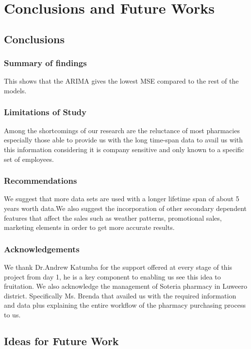 \documentclass[12pt]{report}
\begin{document}
\chapter{Conclusions and Future Works}

\section{Conclusions}

\subsection{Summary of findings}
This shows that the ARIMA gives the lowest MSE compared to the rest of the models.
\subsection{Limitations of Study}
Among the shortcomings of our research are the reluctance of most pharmacies especially those able to provide us with the long time-span data to avail us with this information considering it is company sensitive and only known to a specific set of employees.

\subsection{Recommendations}
We suggest that more data sets are used with a longer lifetime span of about 5 years worth data.We also suggest the incorporation of other secondary dependent features that affect the sales such as weather patterns, promotional sales, marketing elements in order to get more accurate results. 

\subsection{Acknowledgements}
We thank Dr.Andrew Katumba for the support offered at every stage of this project from day 1, he is a key component to enabling us see this idea to fruitation. We also acknowledge the management of Soteria pharmacy in Luweero district. Specifically Ms. Brenda that availed us with the required information and data plus explaining the entire workflow of the pharmacy purchasing process to us.\\

\section{Ideas for Future Work}
\end{document}
